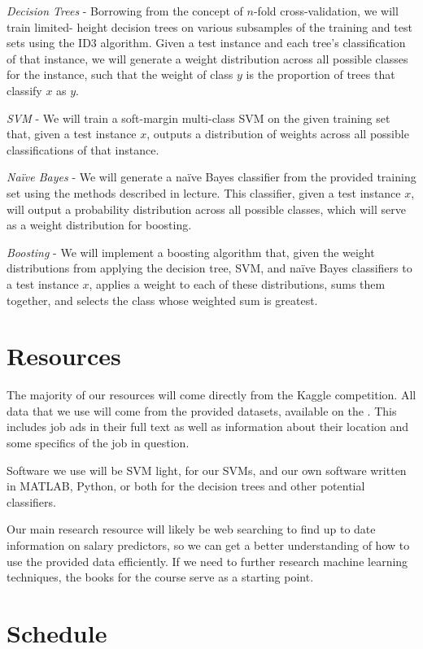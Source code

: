 \documentclass{pset}
\begin{document}
{\it Decision Trees} - Borrowing from the concept of $n$-fold cross-validation,
we will train limited- height decision trees on various subsamples of the
training and test sets using the ID3 algorithm. Given a test instance and each
tree's classification of that instance, we will generate a weight distribution
across all possible classes for the instance, such that the weight of class $y$
is the proportion of trees that classify $x$ as $y$.

{\it SVM} - We will train a soft-margin multi-class SVM on the given training
set that, given a test instance $x$, outputs a distribution of weights across
all possible classifications of that instance.

{\it Naïve Bayes} - We will generate a naïve Bayes classifier from the provided
training set using the methods described in lecture. This classifier, given a
test instance $x$, will output a probability distribution across all possible
classes, which will serve as a weight distribution for boosting.

{\it Boosting} - We will implement a boosting algorithm that, given the weight
distributions from applying the decision tree, SVM, and naïve Bayes classifiers
to a test instance $x$, applies a weight to each of these distributions, sums
them together, and selects the class whose weighted sum is greatest.

\section*{Resources}

The majority of our resources will come directly from the Kaggle competition.
All data that we use will come from the provided datasets, available on the
.
This includes job ads in their full text as well as information about their
location and some specifics of the job in question.

Software we use will be SVM light, for our SVMs, and our own software written
in MATLAB, Python, or both for the decision trees and other potential
classifiers.

Our main research resource will likely be web searching to find up to date
information on salary predictors, so we can get a better understanding of how
to use the provided data efficiently. If we need to further research machine
learning techniques, the books for the course serve as a starting point.

\section*{Schedule}
\end{document}
